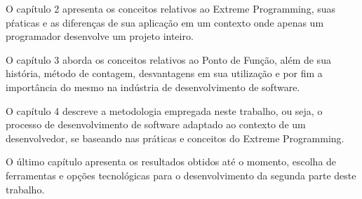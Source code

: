O capítulo 2 apresenta os conceitos relativos ao Extreme Programming, suas
pŕaticas e as diferenças de sua aplicação em um contexto onde apenas um
programador desenvolve um projeto inteiro.

O capítulo 3 aborda os conceitos relativos ao Ponto de Função, além de sua história, método de contagem, desvantagens em sua utilização e por fim  a
importância do mesmo na indústria de desenvolvimento de software.

O capítulo 4 descreve a metodologia empregada neste trabalho, ou seja,
o processo de desenvolvimento de software adaptado ao contexto de um
desenvolvedor, se baseando nas práticas e conceitos do Extreme Programming.

O último capítulo apresenta os resultados obtidos até o momento, escolha de
ferramentas e opções tecnológicas para o desenvolvimento da segunda parte deste
trabalho.
